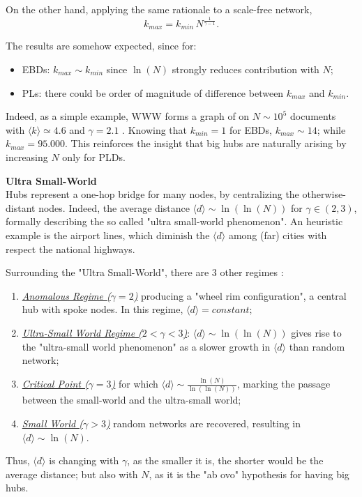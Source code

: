 \documentclass[a4paper,10pt]{book} %
\theoremstyle{definition}
\begin{document}
On the other hand, applying the same rationale to a scale-free network, 
\begin{equation}
	k_{max} = k_{min}\,N^{\frac{1}{\gamma-1}}.
	\label{eq:SFkmax_up}
\end{equation}

The results are somehow expected, since for:
\begin{itemize}
	\item EBDs: $k_{max} \sim k_{min}$ since $\ln(N)$ strongly reduces contribution with $N$;
	\item PLs: there could be order of magnitude of difference between $k_{max}$ and $k_{min}$.
\end{itemize} 
Indeed, as a simple example, WWW forms a graph of on $N \sim 10^5$ documents with $\langle k \rangle \simeq 4.6$ and $\gamma = 2.1$ \cite{barabasi::2016networkbook}. 
Knowing that $k_{min} = 1$ for EBDs, $k_{max} \sim 14$; while $k_{max} = 95.000$. 
This reinforces the insight that big hubs are naturally arising by increasing $N$ only for PLDs.
\label{sec:SFProperties_up}

{\large \textbf{Ultra Small-World}} \\
Hubs represent a one-hop bridge for many nodes, by centralizing the otherwise-distant nodes. Indeed, the average distance $\langle d \rangle \sim \ln(\ln(N))$ for $\gamma \in (2,3)$, formally describing the so called "ultra small-world phenomenon". An heuristic example is the airport lines, which diminish the \(\langle d \rangle\) among (far) cities with respect the national highways.

Surrounding the "Ultra Small-World", there are $3$ other regimes
\cite{Cohen:2003_SFUSW}:
\begin{enumerate}
	\item \underline{\textit{Anomalous Regime ($\gamma = 2$)}} producing a "wheel rim configuration", 
	a central hub with spoke nodes. In this regime, $\langle d \rangle = constant$;
	\item \underline{\textit{Ultra-Small World Regime ($2 < \gamma < 3$)}}: $\langle d \rangle \sim \ln(\ln(N))$ gives rise to the "ultra-small world phenomenon" as a slower growth in $\langle d \rangle$ than random network;
	\item \underline{\textit{Critical Point ($\gamma = 3$)}} for which $\langle d \rangle \sim \frac{\ln(N)}{\ln(\ln(N))}$, marking the passage between the small-world and the ultra-small world;
	\item \underline{\textit{Small World ($\gamma > 3$)}} random networks are recovered, resulting in $\langle d \rangle \sim \ln(N)$.
\end{enumerate}
Thus, \(\langle d \rangle\) is changing with $\gamma$, as the smaller it is, the shorter would be the average distance; but also with $N$, as it is the "ab ovo" hypothesis for having big hubs.
\end{document}
